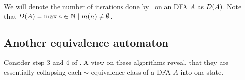 We will denote the number of iterations done by \CompDist\ on an DFA $A$ as $D(A)$. Note that $D(A) = \max n \in \mathbb{N}\ |\ m(n) \neq \emptyset$. 

%


\subsection{Another equivalence automaton}

Consider step 3 and 4 of \MinAlg. A view on these algorithms reveal, that they are essentially collapsing each $\sim$-equivalence class of a DFA $A$ into one state.

